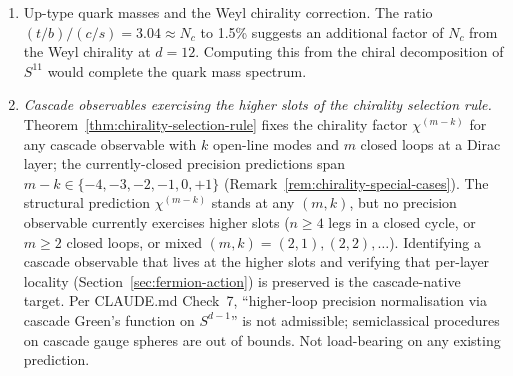 \documentclass[12pt,a4paper]{article}
\begin{document}
\begin{enumerate}
\item Up-type quark masses and the Weyl chirality correction. The ratio $(t/b)/(c/s) = 3.04 \approx N_c$ to 1.5\% suggests an additional factor of $N_c$ from the Weyl chirality at $d = 12$. Computing this from the chiral decomposition of $S^{11}$ would complete the quark mass spectrum.

\item\label{oq:chirality-selection-extensions} \emph{Cascade observables exercising the higher slots of the chirality selection rule.} Theorem~\ref{thm:chirality-selection-rule} fixes the chirality factor $\chi^{(m-k)}$ for any cascade observable with $k$ open-line modes and $m$ closed loops at a Dirac layer; the currently-closed precision predictions span $m-k\in\{-4,-3,-2,-1,0,+1\}$ (Remark~\ref{rem:chirality-special-cases}). The structural prediction $\chi^{(m-k)}$ stands at any $(m,k)$, but no precision observable currently exercises higher slots ($n\geq 4$ legs in a closed cycle, or $m\geq 2$ closed loops, or mixed $(m,k)=(2,1),(2,2),\ldots$). Identifying a cascade observable that lives at the higher slots and verifying that per-layer locality (Section~\ref{sec:fermion-action}) is preserved is the cascade-native target. Per CLAUDE.md Check~7, ``higher-loop precision normalisation via cascade Green's function on $S^{d-1}$'' is not admissible; semiclassical procedures on cascade gauge spheres are out of bounds. Not load-bearing on any existing prediction.


\end{enumerate}
\end{document}
